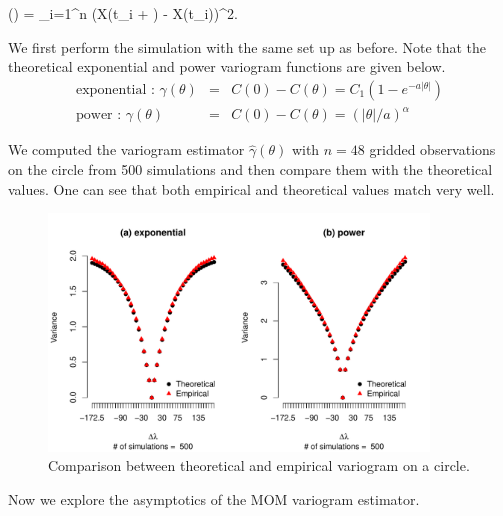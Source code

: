 \beq
\hat{\gamma}(\Delta \lambda) =  \sum_{i=1}^n (X(t_i + \Delta \lambda) - X(t_i))^2.
\eeq

We first perform the simulation with the same set up as before. Note that the theoretical exponential and power variogram functions are given below.
\begin{eqnarray*}
	\mbox{exponential : }\gamma(\theta) &=& C(0) - C(\theta) = C_1(1-e^{-a|\theta|}) \\
	\mbox{power : } \gamma(\theta) &=& C(0) - C(\theta) = (|\theta|/a)^{\alpha}
\end{eqnarray*}

We computed the variogram estimator $\hat{\gamma}(\theta)$ with $n = 48$ gridded observations on the circle from 500 simulations and then compare them with the theoretical values. One can see that both empirical and theoretical values match very well.


\begin{figure}[H]
	\centering
	\includegraphics[width=0.9\textwidth]{graphs/variogram_plot_500}
	\caption[Comparison between theoretical and empirical variogram on a circle.]{Comparison between theoretical and empirical variogram on a circle.}
\end{figure}




Now we explore the asymptotics of the MOM variogram estimator.

